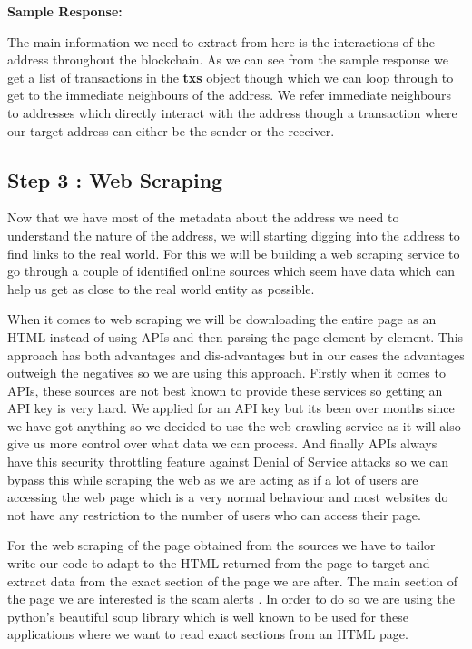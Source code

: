 \documentclass{article}
\begin{document}
        \textbf{Sample Response: }
        
        
        
        The main information we need to extract from here is the interactions of the address throughout the blockchain. As we can see from the sample response we get a list of transactions in the \textbf{txs} object though which we can loop through to get to the immediate neighbours of the address. We refer immediate neighbours to addresses which directly interact with the address though a transaction where our target address can either be the sender or the receiver. 
        
\pagebreak 

    \subsection{Step 3 : Web Scraping}
        Now that we have most of the metadata about the address we need to understand the nature of the address, we will starting digging into the address to find links to the real world. For this we will be building a web scraping service to go through a couple of identified online sources which seem have data which can help us get as close to the real world entity as possible. 
        
        When it comes to web scraping we will be downloading the entire page as an HTML instead of using APIs and then parsing the page element by element. This approach has both advantages and dis-advantages but in our cases the advantages outweigh the negatives so we are using this approach. Firstly when it comes to APIs, these sources are not best known to provide these services so getting an API key is very hard. We applied for an API key but its been over months since we have got anything so we decided to use the web crawling service as it will also give us more control over what data we can process. And finally APIs always have this security throttling feature against Denial of Service attacks so we can bypass this while scraping the web as we are acting as if a lot of users are accessing the web page which is a very normal behaviour and most websites do not have any restriction to the number of users who can access their page.
        
        For the web scraping of the page obtained from the sources we have to tailor write our code to adapt to the HTML returned from the page to target and extract data from the exact section of the page we are after. The main section of the page we are interested is the scam alerts \cite{}. In order to do so we are using the python's\cite{python.org} beautiful soup\cite{beautiful_soup_documentation} library which is well known to be used for these applications where we want to read exact sections from an HTML page.
        
\end{document}
